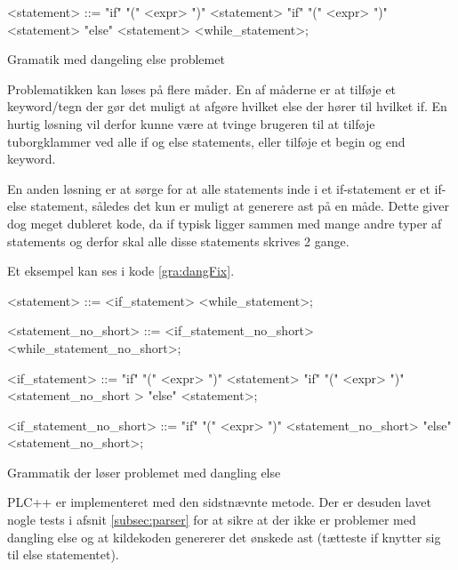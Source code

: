 \begin{Grammar}
 \begin{grammar}
    <statement> ::= "if" "(" <expr> ")" <statement> 
    \alt "if" "(" <expr> ")" <statement> "else" <statement>
    \alt <while\_statement>;
 \end{grammar}
 \caption{Gramatik med dangeling else problemet}\label{gra:dangProb}
\end{Grammar}



\noindent Problematikken kan løses på flere måder. En af måderne er at tilføje et keyword/tegn der gør det muligt at afgøre hvilket else der hører til hvilket if. En hurtig løsning vil derfor kunne være at tvinge brugeren til at tilføje tuborgklammer ved alle if og else statements, eller tilføje et begin og end keyword.

En anden løsning er at sørge for at alle statements inde i et if-statement er et if-else statement, således det kun er muligt at generere \gls{ast} på en måde. Dette giver dog meget dubleret kode, da if typisk ligger sammen med mange andre typer af statements og derfor skal alle disse statements skrives 2 gange.

Et eksempel kan ses i kode \ref{gra:dangFix}.

\begin{Grammar}
 \begin{grammar}
    <statement> ::= <if\_statement>
    \alt <while\_statement>;
    
    <statement\_no\_short> ::= <if\_statement\_no\_short>
    \alt <while\_statement\_no\_short>;
    
    <if\_statement> ::= "if" "(" <expr> ")" <statement> 
    \alt"if" "(" <expr> ")" <statement\_no\_short > "else" <statement>;
    
    <if\_statement\_no\_short> ::= "if" "(" <expr> ")" <statement\_no\_short> "else" <statement\_no\_short>;
 \end{grammar}
 \caption{Grammatik der løser problemet med dangling else}\label{gra:dangFix}
\end{Grammar}

\noindent PLC++ er implementeret med den sidstnævnte metode. Der er desuden lavet nogle tests i afsnit \ref{subsec:parser} for at sikre at der ikke er problemer med dangling else og at kildekoden genererer det ønskede \gls{ast} (tætteste if knytter sig til else statementet).

